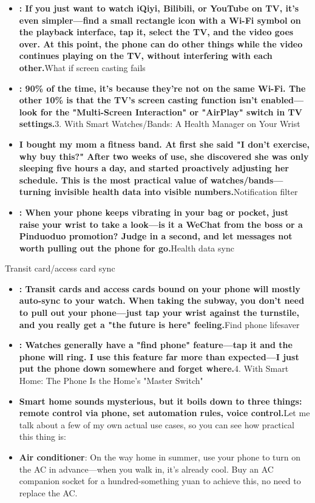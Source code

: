 \begin{itemize}
  \item \textbf{: If you just want to watch iQiyi, Bilibili, or YouTube on TV, it's even simpler—find a small rectangle icon with a Wi-Fi symbol on the playback interface, tap it, select the TV, and the video goes over. At this point, the phone can do other things while the video continues playing on the TV, without interfering with each other.}What if screen casting fails
  \item \textbf{: 90\% of the time, it's because they're not on the same Wi-Fi. The other 10\% is that the TV's screen casting function isn't enabled—look for the "Multi-Screen Interaction" or "AirPlay" switch in TV settings.}3. With Smart Watches/Bands: A Health Manager on Your Wrist
  \item \textbf{I bought my mom a fitness band. At first she said "I don't exercise, why buy this?" After two weeks of use, she discovered she was only sleeping five hours a day, and started proactively adjusting her schedule. This is the most practical value of watches/bands—turning invisible health data into visible numbers.}Notification filter
  \item \textbf{: When your phone keeps vibrating in your bag or pocket, just raise your wrist to take a look—is it a WeChat from the boss or a Pinduoduo promotion? Judge in a second, and let messages not worth pulling out the phone for go.}Health data sync
\end{itemize}


Transit card/access card sync

\begin{itemize}
  \item \textbf{: Transit cards and access cards bound on your phone will mostly auto-sync to your watch. When taking the subway, you don't need to pull out your phone—just tap your wrist against the turnstile, and you really get a "the future is here" feeling.}Find phone lifesaver
  \item \textbf{: Watches generally have a "find phone" feature—tap it and the phone will ring. I use this feature far more than expected—I just put the phone down somewhere and forget where.}4. With Smart Home: The Phone Is the Home's "Master Switch"
  \item \textbf{Smart home sounds mysterious, but it boils down to three things: remote control via phone, set automation rules, voice control.}Let me talk about a few of my own actual use cases, so you can see how practical this thing is:
  \item \textbf{Air conditioner}: On the way home in summer, use your phone to turn on the AC in advance—when you walk in, it's already cool. Buy an AC companion socket for a hundred-something yuan to achieve this, no need to replace the AC.
\end{itemize}

